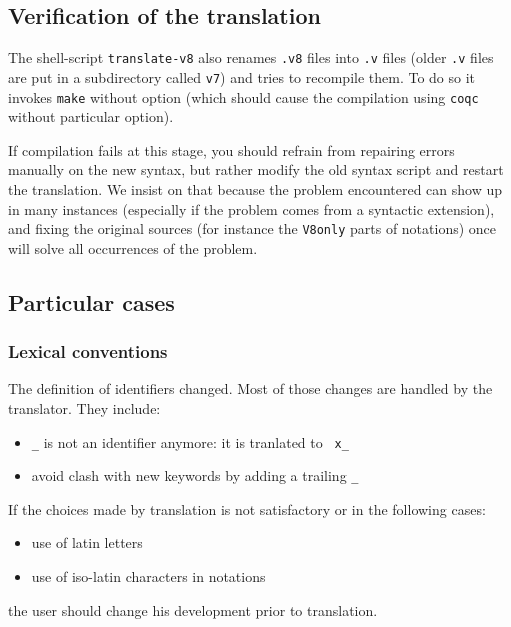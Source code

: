 \documentclass[11pt,a4paper]{article}
\begin{document}
\subsection{Verification of the translation}

The shell-script {\tt translate-v8} also renames {\tt .v8} files into
{\tt .v} files (older {\tt .v} files are put in a subdirectory called
{\tt v7}) and tries to recompile them. To do so it invokes {\tt make}
without option (which should cause the compilation using {\tt coqc}
without particular option).

If compilation fails at this stage, you should refrain from repairing
errors manually on the new syntax, but rather modify the old syntax
script and restart the translation. We insist on that because the
problem encountered can show up in many instances (especially if the
problem comes from a syntactic extension), and fixing the original
sources (for instance the {\tt V8only} parts of notations) once will
solve all occurrences of the problem.


\subsection{Particular cases}

\subsubsection{Lexical conventions}

The definition of identifiers changed. Most of those changes are
handled by the translator. They include:
\begin{itemize}
\item {\tt \_} is not an identifier anymore: it is tranlated to {\tt
x\_}
\item avoid clash with new keywords by adding a trailing {\tt \_}
\end{itemize}

If the choices made by translation is not satisfactory 
or in the following cases:
\begin{itemize}
\item use of latin letters
\item use of iso-latin characters in notations
\end{itemize}
the user should change his development prior to translation.
\end{document}
